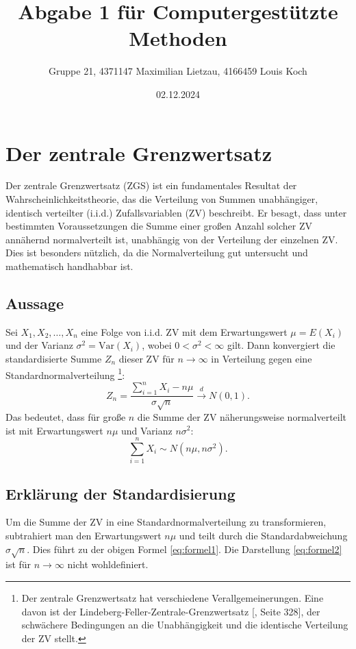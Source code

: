 \documentclass[a4paper,11pt]{article}
\title{Abgabe 1 für Computergestützte Methoden}
\author{Gruppe 21, 4371147 Maximilian Lietzau, 4166459 Louis Koch}
\date{02.12.2024}
\begin{document}
\maketitle

\tableofcontents

\newpage

\section{Der zentrale Grenzwertsatz}
Der zentrale Grenzwertsatz (ZGS) ist ein fundamentales Resultat der Wahrscheinlichkeitstheorie, das die Verteilung von Summen unabhängiger, identisch verteilter (i.i.d.) Zufallsvariablen (ZV) beschreibt. Er besagt, dass unter bestimmten Voraussetzungen die Summe einer großen Anzahl solcher ZV annähernd normalverteilt ist, unabhängig von der Verteilung der einzelnen ZV. Dies ist besonders nützlich, da die Normalverteilung gut untersucht und mathematisch handhabbar ist.

\subsection{Aussage}
Sei \( X_1, X_2, \dots, X_n \) eine Folge von i.i.d. ZV mit dem Erwartungswert \( \mu = E(X_i) \) und der Varianz \( \sigma^2 = \text{Var}(X_i) \), wobei \( 0 < \sigma^2 < \infty \) gilt. Dann konvergiert die standardisierte Summe \( Z_n \) dieser ZV für \( n \to \infty \) in Verteilung gegen eine Standardnormalverteilung \footnote{  Der zentrale Grenzwertsatz hat verschiedene Verallgemeinerungen. Eine davon ist der
Lindeberg-Feller-Zentrale-Grenzwertsatz [\cite{Klenke2013}, Seite 328], der schwächere Bedingungen an
die Unabhängigkeit und die identische Verteilung der ZV stellt.}:
\begin{equation}
Z_n = \frac{\sum_{i=1}^{n} X_i - n \mu}{\sigma \sqrt{n}} \xrightarrow{d} N(0, 1).
\label{eq:formel1}
\end{equation}
Das bedeutet, dass für große \( n \) die Summe der ZV näherungsweise normalverteilt ist mit Erwartungswert \( n \mu \) und Varianz \( n \sigma^2 \):
\begin{equation}
\sum_{i=1}^{n} X_i \sim N(n \mu, n \sigma^2).
\label{eq:formel2}
\end{equation}

\subsection{Erklärung der Standardisierung}
Um die Summe der ZV in eine Standardnormalverteilung zu transformieren, subtrahiert man den Erwartungswert \( n \mu \) und teilt durch die Standardabweichung \( \sigma \sqrt{n} \). Dies führt zu der obigen Formel \ref{eq:formel1}. Die Darstellung \ref{eq:formel2} ist für \( n \to \infty \) nicht wohldefiniert.
\end{document}
